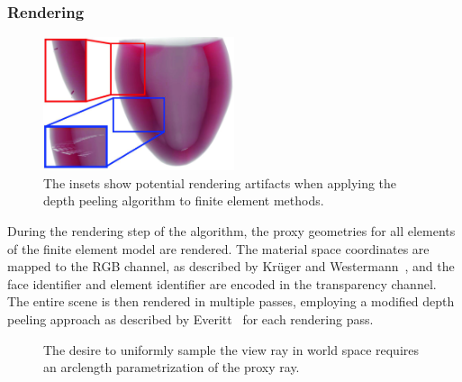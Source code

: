 \subsubsection{Rendering} \label{contributions:fem:rendering}
\begin{figure}
    \centering
    \includegraphics[width=0.5\textwidth]{figures/contributions/fem/heartfine.jpg}
    \caption{The insets show potential rendering artifacts when applying the depth peeling algorithm to finite element methods.}
    \label{contributions:fem:peeling}
\end{figure}
During the rendering step of the algorithm, the proxy geometries for all elements of the finite element model are rendered.  The material space coordinates are mapped to the RGB channel, as described by Kr\"uger and Westermann~\cite{kruger2003acceleration}, and the face identifier and element identifier are encoded in the transparency channel.  The entire scene is then rendered in multiple passes, employing a modified depth peeling approach as described by Everitt~\cite{everitt2001interactive} for each rendering pass.

\begin{figure}
\centering
{}
\caption{The desire to uniformly sample the view ray in world space requires an arclength parametrization of the proxy ray.}
\label{contributions:fem:arclength}
\end{figure}

